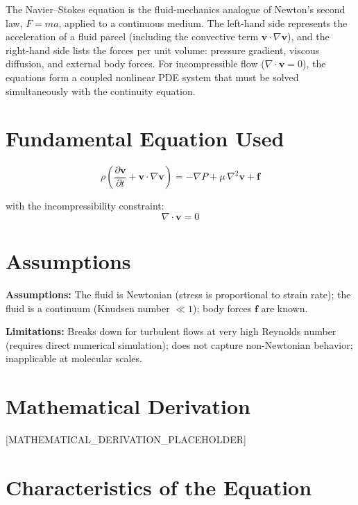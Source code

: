 \documentclass[11pt,openright]{book}
\begin{document}
The Navier--Stokes equation is the fluid-mechanics analogue of Newton's second law, $F = ma$, applied to a continuous medium. The left-hand side represents the acceleration of a fluid parcel (including the convective term $\mathbf{v}\cdot\nabla\mathbf{v}$), and the right-hand side lists the forces per unit volume: pressure gradient, viscous diffusion, and external body forces. For incompressible flow ($\nabla\cdot\mathbf{v} = 0$), the equations form a coupled nonlinear PDE system that must be solved simultaneously with the continuity equation.
\section*{Fundamental Equation Used}

\begin{equation}
\boxed{\;\rho\left(\frac{\partial \mathbf{v}}{\partial t} + \mathbf{v}\cdot\nabla\mathbf{v}\right) = -\nabla P + \mu\,\nabla^{2}\mathbf{v} + \mathbf{f}\;}
\label{eq:navier-stokes}
\end{equation}

with the incompressibility constraint:
\begin{equation}
\nabla\cdot\mathbf{v} = 0
\label{eq:continuity}
\end{equation}
\section*{Assumptions}

\textbf{Assumptions:} The fluid is Newtonian (stress is proportional to strain rate); the fluid is a continuum (Knudsen number $\ll 1$); body forces $\mathbf{f}$ are known.


\textbf{Limitations:} Breaks down for turbulent flows at very high Reynolds number (requires direct numerical simulation); does not capture non-Newtonian behavior; inapplicable at molecular scales.


\section*{Mathematical Derivation}

[MATHEMATICAL_DERIVATION_PLACEHOLDER]

\section*{Characteristics of the Equation}
\end{document}

